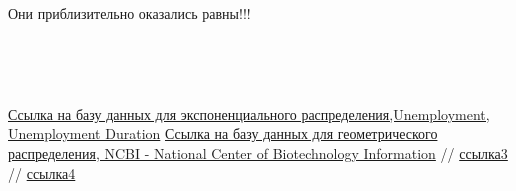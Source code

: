\documentclass[a4paper,12pt, oneside]{book}
\begin{document}
Они приблизительно оказались равны!!!

\begin{figure}[h!]
	\begin{center}
		\begin{minipage}[h]{0.47\linewidth}
			\\
			\vspace{15mm}
		\end{minipage}
		\hfill	
		\begin{minipage}[h]{0.47\linewidth}
			 \\
		\end{minipage}
	\end{center}
\end{figure}


\begin{thebibliography}{99}
	 \href{https://vincentarelbundock.github.io/Rdatasets/datasets.html}{Ссылка на базу данных для экспоненциального распределения,Unemployment,  Unemployment Duration}
	  \href{https://www.ncbi.nlm.nih.gov/nuccore/NC_024460.2?report=fasta&from=10460803&to=10470316}{Ссылка на базу данных для геометрического распределения, NCBI - National Center of Biotechnology Information}
	  // \href{http://www.ams.jhu.edu/~dan/550.435/notes/COURSENOTES435.pdf}{ссылка3}
	  // \href{http://www.obzh.ru/nad/4-3.html}{ссылка4}
\end{thebibliography}
\end{document}
